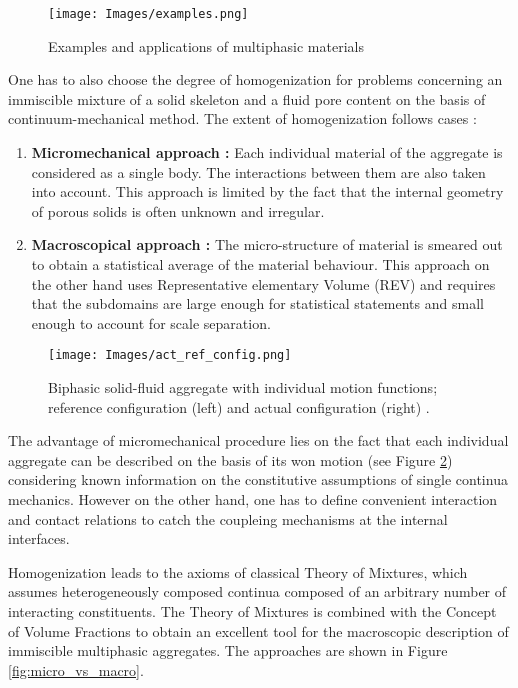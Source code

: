 \documentclass[12pt]{article}
\begin{document}
\begin{figure}[h!]
	\centering
	\texttt{[image: Images/examples.png]}
	\caption{Examples and applications of multiphasic materials}
	\label{fig:examples_applications}
\end{figure}


One has to also choose the degree of homogenization for problems concerning an immiscible mixture of a solid skeleton and a fluid pore content on the basis of continuum-mechanical method. The extent of homogenization follows cases \cite{Ehlers2002}:

\begin{enumerate} 
	\item \textbf{Micromechanical approach :} Each  individual material of the aggregate is considered as a single body. The interactions between them are also taken into account. This approach is limited by the fact that the internal geometry of porous solids is often unknown and irregular.
	
	\item \textbf{Macroscopical approach :}  The micro-structure of material is smeared out to obtain a statistical average of the material behaviour. This approach on the other hand uses Representative elementary Volume (REV) and requires that the subdomains are large enough for statistical statements and small enough to account for scale separation.
	
\end{enumerate}

\vspace{1cm}

\begin{figure}[H]
	\centering
	\texttt{[image: Images/act\_ref\_config.png]}
	\caption{Biphasic solid-fluid aggregate with individual motion functions; reference configuration (left) and actual configuration (right) \cite{Ehlers2002}.}
	\label{fig:continumm_mech}
\end{figure}

The advantage of micromechanical procedure lies on the fact that each individual aggregate can be described on the basis of its won motion (see Figure \ref{fig:continumm_mech}) considering known information on the constitutive assumptions of single continua mechanics. However on the other hand, one has to define convenient interaction and contact relations to catch the coupleing mechanisms at the internal interfaces.

\newpage
Homogenization leads to the axioms of classical Theory of Mixtures, which assumes heterogeneously composed continua composed of an arbitrary number of interacting constituents. The Theory of Mixtures is combined with the Concept of Volume Fractions to obtain an excellent tool for the macroscopic description of immiscible multiphasic aggregates. The approaches are shown in Figure \ref{fig:micro_vs_macro}.
\end{document}
